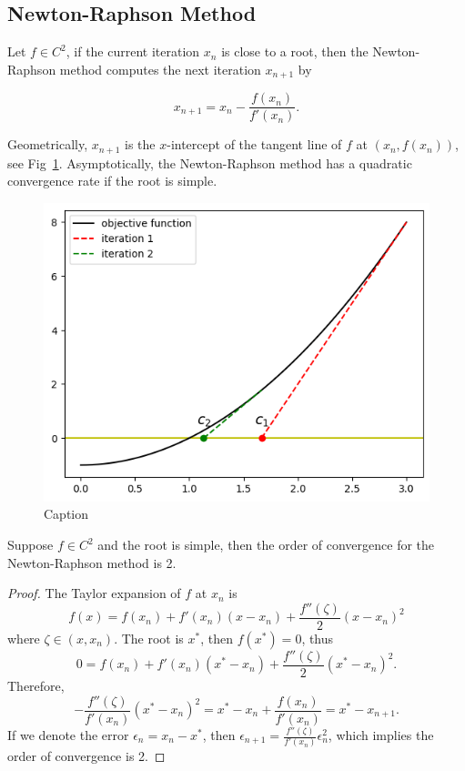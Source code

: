 \subsection{Newton-Raphson Method}
Let $f\in C^2$, if the current iteration $x_{n}$ is close to a root, then the Newton-Raphson method computes the next iteration $x_{n+1}$ by

$$
x_{n+1} = x_n - \frac{f(x_n)}{f'(x_n)}.
$$

Geometrically, $x_{n+1}$ is the $x$-intercept of the tangent line of $f$ at $(x_n, f(x_n))$, see Fig~\ref{FIG: 0-RO-FI-NE-ME}. Asymptotically, the Newton-Raphson method has a quadratic convergence rate if the root is simple.

\begin{figure}[!htb]
    \centering
    \includegraphics[scale=0.6]{Figures/root_finding_img_2.png}
    \caption{Caption}
    \label{FIG: 0-RO-FI-NE-ME}
\end{figure}

\begin{theorem}
Suppose $f\in C^2$ and the root is simple, then the order of convergence for the Newton-Raphson method is 2.
\end{theorem}
\begin{proof}
The Taylor expansion of $f$ at $x_n$ is
$$f(x) = f(x_n) + f'(x_n)(x - x_n) + \frac{f''(\zeta)}{2}(x - x_n)^2$$
where $\zeta\in (x, x_n)$. The root is $x^{\ast}$, then $f(x^{\ast}) = 0$, thus
$$0 = f(x_n) + f'(x_n)(x^{\ast} - x_n) + \frac{f''(\zeta)}{2}(x^{\ast} - x_n)^2.$$
Therefore,
$$
-\frac{f''(\zeta)}{f'(x_n)} (x^{\ast} - x_n)^2= x^{\ast} - x_n + \frac{f(x_n)}{f'(x_n)} = x^{\ast} - x_{n+1}.
$$
If we denote the error $\epsilon_{n} = x_n - x^{\ast}$, then $\epsilon_{n+1} = \frac{f''(\zeta)}{f'(x_n)} \epsilon_{n}^2$, which implies the order of convergence is 2.
\end{proof}
